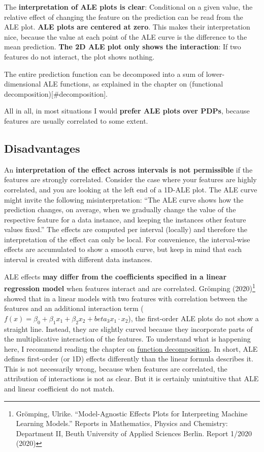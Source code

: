 \documentclass[12pt,]{krantz}
\begin{document}
The \textbf{interpretation of ALE plots is clear}: Conditional on a
given value, the relative effect of changing the feature on the
prediction can be read from the ALE plot. \textbf{ALE plots are centered
at zero}. This makes their interpretation nice, because the value at
each point of the ALE curve is the difference to the mean prediction.
\textbf{The 2D ALE plot only shows the interaction}: If two features do
not interact, the plot shows nothing.

The entire prediction function can be decomposed into a sum of
lower-dimensional ALE functions, as explained in the chapter on
(functional decomposition){[}\#decomposition{]}.

All in all, in most situations I would \textbf{prefer ALE plots over
PDPs}, because features are usually correlated to some extent.

\subsection{Disadvantages}\label{disadvantages-6}

An \textbf{interpretation of the effect across intervals is not
permissible} if the features are strongly correlated. Consider the case
where your features are highly correlated, and you are looking at the
left end of a 1D-ALE plot. The ALE curve might invite the following
misinterpretation: ``The ALE curve shows how the prediction changes, on
average, when we gradually change the value of the respective feature
for a data instance, and keeping the instances other feature values
fixed.'' The effects are computed per interval (locally) and therefore
the interpretation of the effect can only be local. For convenience, the
interval-wise effects are accumulated to show a smooth curve, but keep
in mind that each interval is created with different data instances.

ALE effects \textbf{may differ from the coefficients specified in a
linear regression model} when features interact and are correlated.
Grömping (2020)\footnote{Grömping, Ulrike. ``Model-Agnostic Effects
  Plots for Interpreting Machine Learning Models.'' Reports in
  Mathematics, Physics and Chemistry: Department II, Beuth University of
  Applied Sciences Berlin. Report 1/2020 (2020)} showed that in a linear
models with two features with correlation between the features and an
additional interaction term
(\(f(x) = \beta_0 + \beta_1 x_1 + \beta_2 x_2 + beta_3 x_1 \cdot x_2\)),
the first-order ALE plots do not show a straight line. Instead, they are
slightly curved because they incorporate parts of the multiplicative
interaction of the features. To understand what is happening here, I
recommend reading the chapter on
\protect\hyperlink{decomposition}{function decomposition}. In short, ALE
defines first-order (or 1D) effects differently than the linear formula
describes it. This is not necessarily wrong, because when features are
correlated, the attribution of interactions is not as clear. But it is
certainly unintuitive that ALE and linear coefficient do not match.
\end{document}
